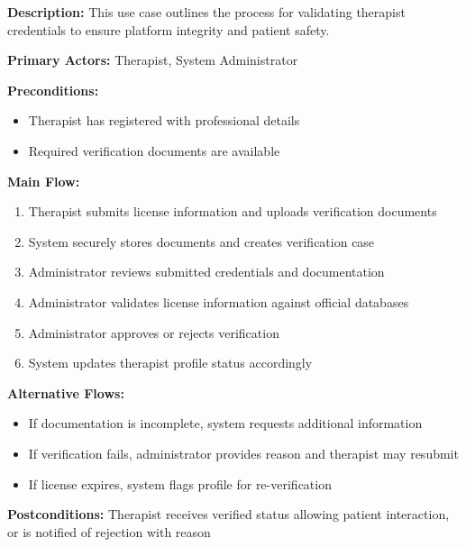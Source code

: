 \textbf{Description:} This use case outlines the process for validating therapist credentials to ensure platform integrity and patient safety.

\textbf{Primary Actors:} Therapist, System Administrator

\textbf{Preconditions:}
\begin{itemize}
    \item Therapist has registered with professional details
    \item Required verification documents are available
\end{itemize}

\textbf{Main Flow:}
\begin{enumerate}
    \item Therapist submits license information and uploads verification documents
    \item System securely stores documents and creates verification case
    \item Administrator reviews submitted credentials and documentation
    \item Administrator validates license information against official databases
    \item Administrator approves or rejects verification
    \item System updates therapist profile status accordingly
\end{enumerate}

\textbf{Alternative Flows:}
\begin{itemize}
    \item If documentation is incomplete, system requests additional information
    \item If verification fails, administrator provides reason and therapist may resubmit
    \item If license expires, system flags profile for re-verification
\end{itemize}

\textbf{Postconditions:} Therapist receives verified status allowing patient interaction, or is notified of rejection with reason